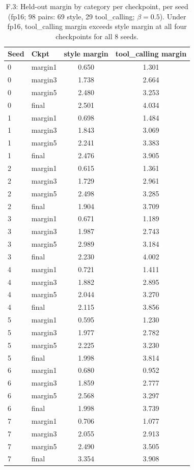 \begin{table}[H]
\centering
\small
\caption{F.3: Held-out margin by category per checkpoint, per seed (fp16; 98 pairs: 69 style, 29 tool\_calling; $\beta{=}0.5$). Under fp16, tool\_calling margin exceeds style margin at all four checkpoints for all 8 seeds.}
\label{tab:heldout-fp16}
\begin{tabular}{@{}llcc@{}}
\toprule
Seed & Ckpt & style margin & tool\_calling margin\\
\midrule
0 & margin1 & 0.650 & 1.301\\
0 & margin3 & 1.738 & 2.664\\
0 & margin5 & 2.480 & 3.253\\
0 & final & 2.501 & 4.034\\
1 & margin1 & 0.698 & 1.484\\
1 & margin3 & 1.843 & 3.069\\
1 & margin5 & 2.241 & 3.383\\
1 & final & 2.476 & 3.905\\
2 & margin1 & 0.615 & 1.361\\
2 & margin3 & 1.729 & 2.961\\
2 & margin5 & 2.498 & 3.285\\
2 & final & 1.904 & 3.709\\
3 & margin1 & 0.671 & 1.189\\
3 & margin3 & 1.987 & 2.743\\
3 & margin5 & 2.989 & 3.184\\
3 & final & 2.230 & 4.002\\
4 & margin1 & 0.721 & 1.411\\
4 & margin3 & 1.882 & 2.895\\
4 & margin5 & 2.044 & 3.270\\
4 & final & 2.115 & 3.856\\
5 & margin1 & 0.595 & 1.230\\
5 & margin3 & 1.977 & 2.782\\
5 & margin5 & 2.225 & 3.230\\
5 & final & 1.998 & 3.814\\
6 & margin1 & 0.680 & 0.952\\
6 & margin3 & 1.859 & 2.777\\
6 & margin5 & 2.568 & 3.297\\
6 & final & 1.998 & 3.739\\
7 & margin1 & 0.706 & 1.077\\
7 & margin3 & 2.055 & 2.913\\
7 & margin5 & 2.490 & 3.505\\
7 & final & 3.354 & 3.908\\
\bottomrule
\end{tabular}
\end{table}

